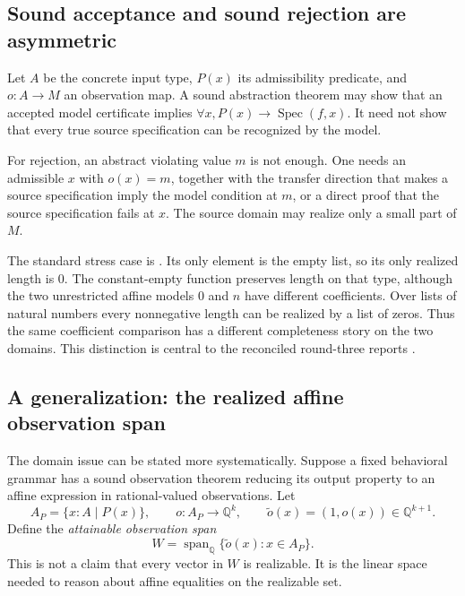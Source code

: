\documentclass[11pt,a4paper]{article}
\newcommand{\code}[1]{\texttt{\detokenize{#1}}}
\newcommand{\Q}{\mathbb Q}
\theoremstyle{definition}
\theoremstyle{remark}
\begin{document}
\subsection{Sound acceptance and sound rejection are asymmetric}
Let $A$ be the concrete input type, $P(x)$ its admissibility predicate, and $o:A\to M$ an observation map. A sound abstraction theorem may show that an accepted model certificate implies $\forall x, P(x)\to\operatorname{Spec}(f,x)$. It need not show that every true source specification can be recognized by the model.

For rejection, an abstract violating value $m$ is not enough. One needs an admissible $x$ with $o(x)=m$, together with the transfer direction that makes a source specification imply the model condition at $m$, or a direct proof that the source specification fails at $x$. The source domain may realize only a small part of $M$.

The standard stress case is \code{List Empty}. Its only element is the empty list, so its only realized length is $0$. The constant-empty function preserves length on that type, although the two unrestricted affine models $0$ and $n$ have different coefficients. Over lists of natural numbers every nonnegative length can be realized by a list of zeros. Thus the same coefficient comparison has a different completeness story on the two domains. This distinction is central to the reconciled round-three reports \cite{r3a,r3b}.

\subsection{A generalization: the realized affine observation span}
The domain issue can be stated more systematically. Suppose a fixed behavioral grammar has a sound observation theorem reducing its output property to an affine expression in rational-valued observations. Let
\[
 A_P=\{x:A\mid P(x)\},\qquad o:A_P\to\Q^k,
 \qquad\widetilde o(x)=(1,o(x))\in\Q^{k+1}.
\]
Define the \emph{attainable observation span}
\[
 W=\operatorname{span}_{\Q}\{\widetilde o(x):x\in A_P\}.
\]
This is not a claim that every vector in $W$ is realizable. It is the linear space needed to reason about affine equalities on the realizable set.
\end{document}

